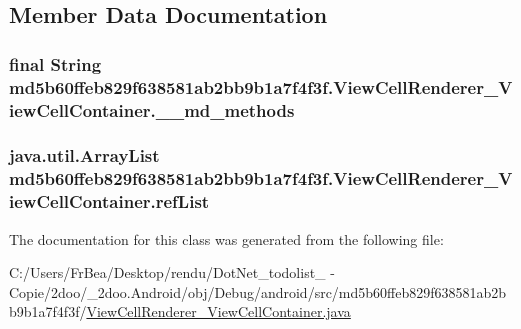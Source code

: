 \subsection{Member Data Documentation}
\hypertarget{classmd5b60ffeb829f638581ab2bb9b1a7f4f3f_1_1_view_cell_renderer___view_cell_container_1f62af5d260be844bb21e32402dd820b}{
\subsubsection[{\_\-\_\-md\_\-methods}]{\setlength{\rightskip}{0pt plus 5cm}final String {\bf md5b60ffeb829f638581ab2bb9b1a7f4f3f.ViewCellRenderer\_\-ViewCellContainer.\_\-\_\-md\_\-methods}}}
\label{classmd5b60ffeb829f638581ab2bb9b1a7f4f3f_1_1_view_cell_renderer___view_cell_container_1f62af5d260be844bb21e32402dd820b}


\hypertarget{classmd5b60ffeb829f638581ab2bb9b1a7f4f3f_1_1_view_cell_renderer___view_cell_container_28b975f2cd679e8f5307b875c6f704f7}{
\subsubsection[{refList}]{\setlength{\rightskip}{0pt plus 5cm}java.util.ArrayList {\bf md5b60ffeb829f638581ab2bb9b1a7f4f3f.ViewCellRenderer\_\-ViewCellContainer.refList}}}
\label{classmd5b60ffeb829f638581ab2bb9b1a7f4f3f_1_1_view_cell_renderer___view_cell_container_28b975f2cd679e8f5307b875c6f704f7}




The documentation for this class was generated from the following file:\begin{CompactItemize}
\item 
C:/Users/FrBea/Desktop/rendu/DotNet\_\-todolist\_ - Copie/2doo/\_\-2doo.Android/obj/Debug/android/src/md5b60ffeb829f638581ab2bb9b1a7f4f3f/\hyperlink{_view_cell_renderer___view_cell_container_8java}{ViewCellRenderer\_\-ViewCellContainer.java}\end{CompactItemize}
